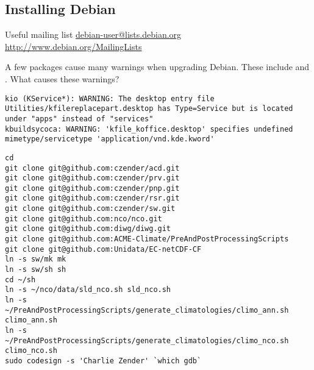 \documentclass[12pt,twoside]{article}
\begin{document}
\subsection{Installing Debian}\label{sxn:dbn_nst}
Useful mailing list \url{debian-user@lists.debian.org}
\url{http://www.debian.org/MailingLists}

A few packages cause many warnings when upgrading Debian. 
These include  and .
What causes these warnings?
\begin{verbatim}
kio (KService*): WARNING: The desktop entry file Utilities/kfilereplacepart.desktop has Type=Service but is located under "apps" instead of "services"
kbuildsycoca: WARNING: 'kfile_koffice.desktop' specifies undefined mimetype/servicetype 'application/vnd.kde.kword'
\end{verbatim}

\begin{verbatim}
cd
git clone git@github.com:czender/acd.git
git clone git@github.com:czender/prv.git
git clone git@github.com:czender/pnp.git
git clone git@github.com:czender/rsr.git
git clone git@github.com:czender/sw.git
git clone git@github.com:nco/nco.git
git clone git@github.com:diwg/diwg.git
git clone git@github.com:ACME-Climate/PreAndPostProcessingScripts
git clone git@github.com:Unidata/EC-netCDF-CF
ln -s sw/mk mk
ln -s sw/sh sh
cd ~/sh
ln -s ~/nco/data/sld_nco.sh sld_nco.sh
ln -s ~/PreAndPostProcessingScripts/generate_climatologies/climo_ann.sh climo_ann.sh
ln -s ~/PreAndPostProcessingScripts/generate_climatologies/climo_nco.sh climo_nco.sh
sudo codesign -s 'Charlie Zender' `which gdb`
\end{verbatim}
\end{document}
